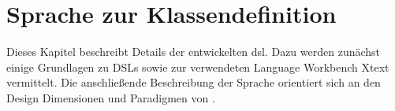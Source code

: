 \section{Sprache zur Klassendefinition}
    \label{section:solutionDetailsDSL}
    Dieses Kapitel beschreibt Details der entwickelten \gls{dsl}.
    Dazu werden zunächst einige Grundlagen zu DSLs sowie
    zur verwendeten Language Workbench Xtext vermittelt.
    Die anschließende Beschreibung der Sprache orientiert sich
    an den Design Dimensionen und Paradigmen von \cite{voelter:DslEngineering}.

    
    
    
    
    
    
    
    
    

